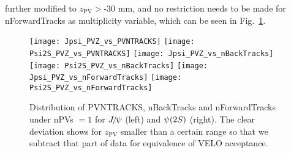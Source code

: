 further modified to $z_{\mathrm{PV}}>$-30 mm, and no restriction needs to be made for nForwardTracks as multiplicity variable, which can be seen in Fig.~\ref{PVZvsPVNTRACKS}. 
\begin{figure}[!tbp]
    \begin{center}
      \texttt{[image: Jpsi\_PVZ\_vs\_PVNTRACKS]}
      \texttt{[image: Psi2S\_PVZ\_vs\_PVNTRACKS]}
      \texttt{[image: Jpsi\_PVZ\_vs\_nBackTracks]}
      \texttt{[image: Psi2S\_PVZ\_vs\_nBackTracks]}
      \texttt{[image: Jpsi\_PVZ\_vs\_nForwardTracks]}
      \texttt{[image: Psi2S\_PVZ\_vs\_nForwardTracks]}
    \end{center}
    \caption{
    Distribution of PVNTRACKS, nBackTracks and nForwardTracks under nPVs $=1$ for ${{J\mskip -3mu/\mskip -2mu\psi}}$ (left) and ${\psi{(2S)}}$ (right). The clear deviation shows for $z_{\mathrm{PV}}$ smaller than a certain range so that we 
    subtract that part of data for equivalence of VELO acceptance.
      }
    \label{PVZvsPVNTRACKS}
  \end{figure}
